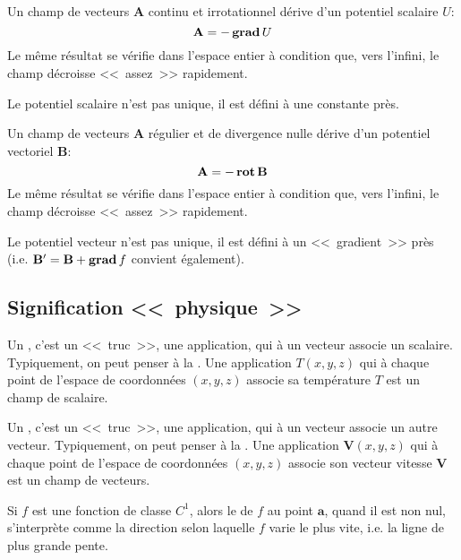 \medskip
Un champ de vecteurs $\mathbf{A} $ continu et irrotationnel dérive d'un potentiel scalaire $U$:
\begin{equation}
 \mathbf{A} = -\operatorname{\mathbf{grad}} U
\end{equation}
Le même résultat se vérifie dans l'espace entier à condition que, vers l'infini, le champ
décroisse <<~assez~>> rapidement.

Le potentiel scalaire n'est pas unique, il est défini à une constante près.

\medskip
Un champ de vecteurs $\mathbf{A} $ régulier et de divergence nulle dérive d'un potentiel vectoriel
$\mathbf{B} $:
\begin{equation}
    \mathbf{A}  = -\operatorname{\mathbf{rot}} \mathbf{B}
\end{equation}
Le même résultat se vérifie dans l'espace entier à condition que, vers l'infini, le champ
décroisse <<~assez~>> rapidement.

Le potentiel vecteur n'est pas unique, il est défini à un <<~gradient~>> près (i.e.
$ \mathbf{B} ' =  \mathbf{B}  + \operatorname{\mathbf{grad}}  f$ convient
également).

\medskip
\subsection{Signification <<~physique~>>}

Un , c'est un <<~truc~>>, une application, qui à un vecteur
associe un scalaire. Typiquement, on peut penser à la .
Une application $T(x,y,z)$ qui à chaque point de l'espace de coordonnées $(x,y,z)$ associe
sa température $T$ est un champ de scalaire.

Un , c'est un <<~truc~>>, une application, qui à un vecteur
associe un autre vecteur. Typiquement, on peut penser à la .
Une application $\mathbf{V}(x,y,z)$ qui à chaque point de l'espace de coordonnées $(x,y,z)$
associe son vecteur vitesse $\mathbf{V}$ est un champ de vecteurs.

\medskip
Si $f$ est une fonction de classe $C^1$, alors le  de $f$ au point $\mathbf{a}$,
quand il est non nul, s'interprète comme la direction selon laquelle $f$ varie le plus vite,
i.e. la ligne de plus grande pente.


